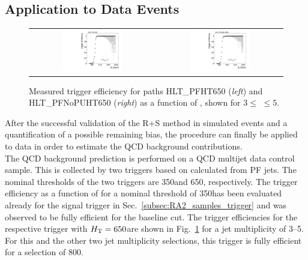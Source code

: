 \subsection{Application to Data Events}
\label{subsec:validation_data_R+S}
\begin{figure}[!t]
  \centering
  \begin{tabular}{cc}
                \includegraphics[width=0.49\textwidth]{figures/turn_on_HT_TagEle27WP80_ProbePFHT650_chs_NJets3-5.pdf} &
                \includegraphics[width=0.49\textwidth]{figures/turn_on_HT_TagEle27WP80_ProbePFNoPUHT650_chs_NJets3-5.pdf} \\
  \end{tabular}
\caption{Measured trigger efficiency for paths HLT\_PFHT650 (\textit{left}) and HLT\_PFNoPUHT650 (\textit{right}) as a function of \HT, shown for $3 \leq$ \NJets $\leq 5$.} 
  \label{fig:trig_eff_650_3njets5}
\end{figure}
After the successful validation of the R+S method in simulated events and a quantification of a possible remaining bias, the procedure can finally be applied to data in order to estimate the QCD background contributions. \\
The QCD background prediction is performed on a QCD multijet data control sample. This is collected by two triggers based on \HT calculated from PF jets. The nominal \HT thresholds of the two triggers are 350\gev and 650\gev, respectively. The trigger efficiency as a function of \HT for a nominal threshold of 350\gev has been evaluated already for the signal trigger in Sec.~\ref{subsec:RA2_samples_trigger} and was observed to be fully efficient for the baseline \HT cut. The trigger efficiencies for the respective trigger with $H_{\text{T}} = 650$\gev are shown in Fig.~\ref{fig:trig_eff_650_3njets5} for a jet multiplicity of 3--5. For this and the other two jet multiplicity selections, this trigger is fully efficient for a \HT selection of 800\gev. \\
